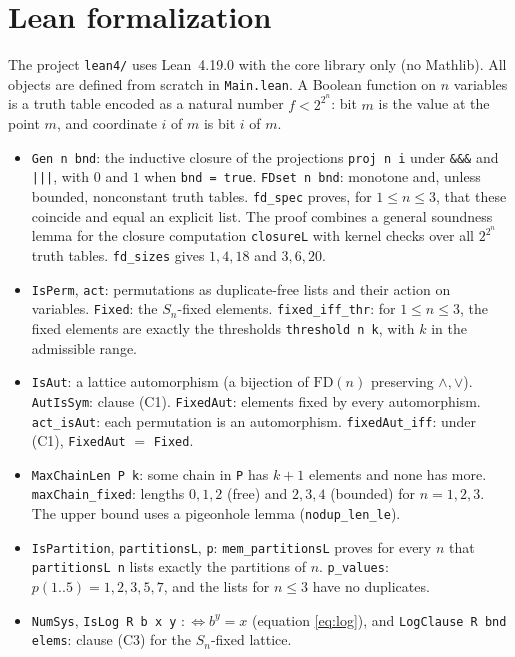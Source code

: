 \documentclass[11pt]{article}
\theoremstyle{definition}
\theoremstyle{remark}
\newcommand{\FD}{\mathrm{FD}}
\begin{document}
\section{Lean formalization}
The project \texttt{lean4/} uses Lean~4.19.0 with the core library only (no
Mathlib). All objects are defined from scratch in \texttt{Main.lean}. A Boolean
function on $n$ variables is a truth table encoded as a natural number
$f<2^{2^n}$: bit $m$ is the value at the point $m$, and coordinate $i$ of $m$ is
bit $i$ of $m$.
\begin{itemize}
\item \texttt{Gen n bnd}: the inductive closure of the projections
\texttt{proj n i} under \texttt{\&\&\&} and \texttt{|||}, with $0$ and $1$ when
\texttt{bnd = true}. \texttt{FDset n bnd}: monotone and, unless bounded,
nonconstant truth tables. \texttt{fd\_spec} proves, for $1\le n\le3$, that these
coincide and equal an explicit list. The proof combines a general soundness
lemma for the closure computation \texttt{closureL} with kernel checks over all
$2^{2^n}$ truth tables. \texttt{fd\_sizes} gives $1,4,18$ and $3,6,20$.
\item \texttt{IsPerm}, \texttt{act}: permutations as duplicate-free lists and
their action on variables. \texttt{Fixed}: the $S_n$-fixed elements.
\texttt{fixed\_iff\_thr}: for $1\le n\le3$, the fixed elements are exactly the
thresholds \texttt{threshold n k}, with $k$ in the admissible range.
\item \texttt{IsAut}: a lattice automorphism (a bijection of $\FD(n)$ preserving
$\wedge,\vee$). \texttt{AutIsSym}: clause (C1). \texttt{FixedAut}: elements fixed
by every automorphism. \texttt{act\_isAut}: each permutation is an automorphism.
\texttt{fixedAut\_iff}: under (C1), \texttt{FixedAut} $=$ \texttt{Fixed}.
\item \texttt{MaxChainLen P k}: some chain in \texttt{P} has $k+1$ elements and
none has more. \texttt{maxChain\_fixed}: lengths $0,1,2$ (free) and $2,3,4$
(bounded) for $n=1,2,3$. The upper bound uses a pigeonhole lemma
(\texttt{nodup\_len\_le}).
\item \texttt{IsPartition}, \texttt{partitionsL}, \texttt{p}: \texttt{mem\_partitionsL}
proves for every $n$ that \texttt{partitionsL n} lists exactly the partitions of
$n$. \texttt{p\_values}: $p(1..5)=1,2,3,5,7$, and the lists for $n\le3$ have no
duplicates.
\item \texttt{NumSys}, \texttt{IsLog R b x y} $:\iff b^y=x$ (equation
\eqref{eq:log}), and \texttt{LogClause R bnd elems}: clause (C3) for the
$S_n$-fixed lattice.
\end{itemize}
\end{document}
